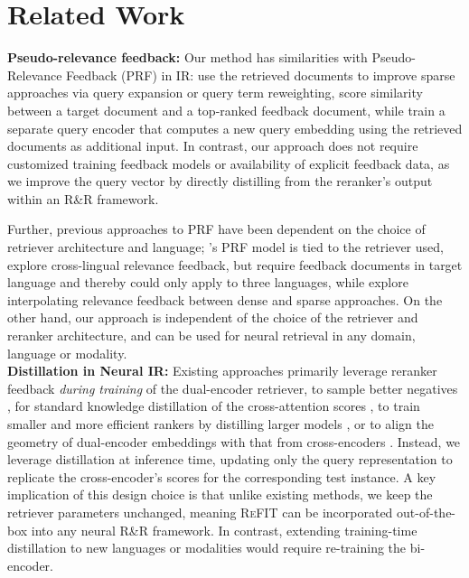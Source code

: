 \section{Related Work}
\label{sec:related-work}
\noindent \textbf{Pseudo-relevance feedback:} Our method has similarities with %
Pseudo-Relevance Feedback (PRF) \cite{rocchio1971relevance, lv2009adaptive, li2022does} in IR: \cite{bendersky2011parameterized, xu2017quary} use the retrieved documents to improve sparse approaches via query expansion or query term reweighting, \cite{li2018nprf, zheng2020bert} score similarity between a target document and a top-ranked feedback document, while \cite{yu2021improving} train a separate query encoder that computes a new query embedding using the retrieved documents as additional input. In contrast, our approach does not require customized training feedback models or availability of explicit feedback data, as we improve the query vector by directly distilling from the reranker's output within an R\&R framework. %

Further, previous approaches to PRF have been dependent on the choice of retriever architecture and language; \cite{yu2021improving}'s PRF model is tied to the retriever used, \cite{chandradevan2022learning} explore cross-lingual relevance feedback, but require feedback documents in target language and thereby could only apply to three languages, while \cite{li2022interpolate} explore interpolating relevance feedback between dense and sparse approaches.
On the other hand, our approach is independent of the choice of the retriever and reranker architecture, and can be used for neural retrieval in any domain, language or modality. \\

\noindent \textbf{Distillation in Neural IR:} Existing approaches primarily leverage reranker feedback \textit{during training} of the dual-encoder retriever, to sample better negatives \cite{qu2021rocketqa}, for standard knowledge distillation of the cross-attention scores \cite{izacard2020distilling}, to train smaller and more efficient rankers by distilling larger models \cite{hofstatter2020improving}, or to align the geometry of dual-encoder embeddings with that from cross-encoders \cite{wang2021enhancing}. Instead, we leverage distillation at inference time, updating only the query representation to replicate the cross-encoder’s scores for the corresponding test instance.
A key implication of this design choice is that unlike existing methods, we keep the retriever parameters unchanged, meaning \textsc{ReFIT} can be incorporated out-of-the-box into any neural R\&R framework. In contrast, extending training-time distillation to new languages or modalities would require re-training the bi-encoder.

